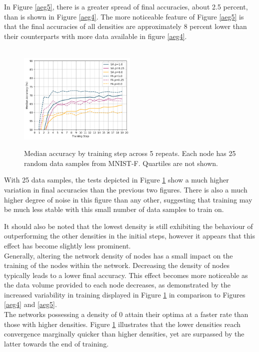 \documentclass[letterpaper, 10 pt, conference]{ieeeconf}  %
\begin{document}
In Figure \ref{aeg5}, there is a greater spread of final accuracies, about 2.5 percent, than is shown in Figure \ref{aeg4}. The more noticeable feature of Figure \ref{aeg5} is that the final accuracies of all densities are approximately 8 percent lower than their counterparts with more data available in figure \ref{aeg4}.

\begin{figure}[H] 
	 \\
	\includegraphics[width=0.5\textwidth]{conf_sparse_ns25}
	\caption{Median accuracy by training step across 5 repeats. Each node has 25 random data samples from MNIST-F. Quartiles are not shown.}
	\label{aeg6}
\end{figure}

With 25 data samples, the tests depicted in Figure \ref{aeg6} show a much higher variation in final accuracies than the previous two figures. There is also a much higher degree of noise in this figure than any other, suggesting that training may be much less stable with this small number of data samples to train on.

It should also be noted that the lowest density is still exhibiting the behaviour of outperforming the other densities in the initial steps, however it appears that this effect has become slightly less prominent. \\


Generally, altering the network density of nodes has a small impact on the training of the nodes within the network. Decreasing the density of nodes typically leads to a lower final accuracy. This effect becomes more noticeable as the data volume provided to each node decreases, as demonstrated by the increased variability in training displayed in Figure \ref{aeg6} in comparison to Figures \ref{aeg4} and \ref{aeg5}. \\

The networks possessing a density of 0 attain their optima at a faster rate than those with higher densities. Figure \ref{aeg6} illustrates that the lower densities reach convergence marginally quicker than higher densities, yet are surpassed by the latter towards the end of training.
\end{document}
